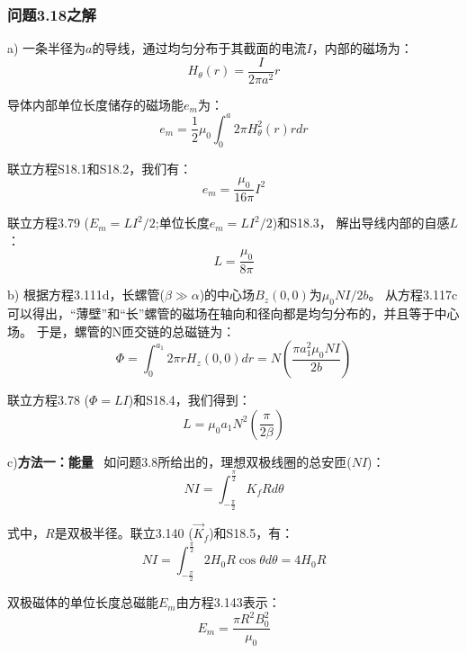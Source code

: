 \subsubsection{问题3.18之解}
a) 一条半径为$a$的导线，通过均匀分布于其截面的电流$I$，内部的磁场为：
 \begin{equation*}%
H_\theta(r)=\frac{I}{2\pi a^2}r \tag{S18.1}
\end{equation*}

导体内部单位长度储存的磁场能$e_m$为：
 \begin{equation*}%
e_m=\frac{1}{2}\mu_0\int_{0}^{a}2\pi H_{\theta}^{2}(r)rdr \tag{S18.2}
\end{equation*}

联立方程S18.1和S18.2，我们有：
 \begin{equation*}%
e_m=\frac{\mu_0}{16\pi}I^2 \tag{S18.3}
\end{equation*}

联立方程3.79 ($E_m =LI^2/2$;单位长度$e_m =LI^2/2$)和S18.3，
解出导线内部的自感$L$：
 \begin{equation*}%
L=\frac{\mu_0}{8\pi} \tag{3.83}
\end{equation*}

b) 根据方程3.111d，长螺管($\beta\gg\alpha$)的中心场$B_z(0, 0)$为$\mu_0 NI/2b$。
从方程3.117c可以得出，“薄壁”和“长”螺管的磁场在轴向和径向都是均匀分布的，并且等于中心场。
于是，螺管的N匝交链的总磁链为：
 \begin{equation*}%
\Phi=\int_{0}^{a_1}2\pi rH_z(0,0)dr=N\left(\frac{\pi a_{1}^{2}\mu_0NI}{2b}\right) \tag{S18.4}
\end{equation*}

联立方程3.78 ($\Phi=LI$)和S18.4，我们得到：
 \begin{equation*}%
L=\mu_0a_1N^2(\frac{\pi}{2\beta}) \tag{3.84c}
\end{equation*}

c)\textbf{方法一：能量} \ 如问题3.8所给出的，理想双极线圈的总安匝($NI$)：
\begin{equation*}%
NI=\int_{-\frac{\pi}{2}}^{\frac{\pi}{2}}K_f Rd\theta \tag{S18.5}
\end{equation*}

式中，$R$是双极半径。联立3.140 ($\vec{K}_f$)和S18.5，有：
\begin{equation*}%
NI=\int_{-\frac{\pi}{2}}^{\frac{\pi}{2}}2H_0R\cos\theta d\theta=4H_0R \tag{S18.6}
\end{equation*}

双极磁体的单位长度总磁能$E_m$由方程3.143表示：
 \begin{equation*}%
E_m=\frac{\pi R^2B_{0}^{2}}{\mu_0} \tag{3.143}
\end{equation*}

